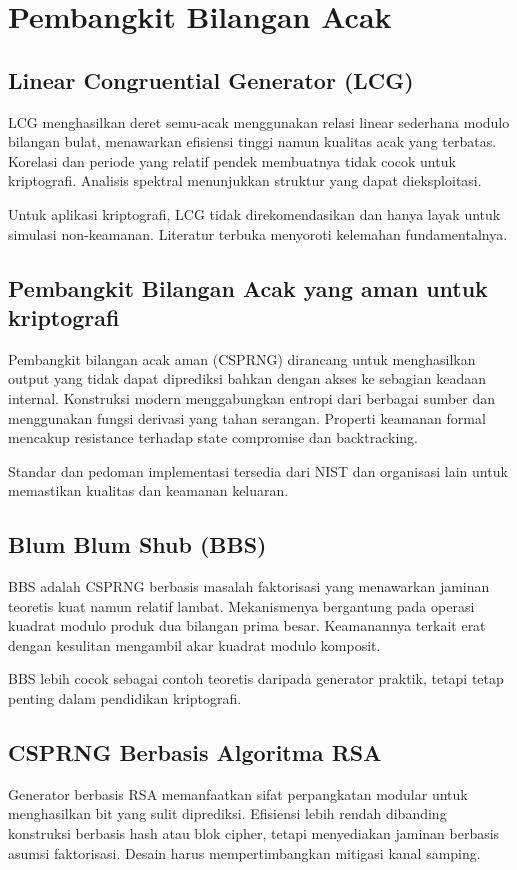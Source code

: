 \documentclass[../main.tex]{subfiles}
\begin{document}
\chapter{Pembangkit Bilangan Acak}

\section{Linear Congruential Generator (LCG)}
LCG menghasilkan deret semu-acak menggunakan relasi linear sederhana modulo bilangan bulat, menawarkan efisiensi tinggi namun kualitas acak yang terbatas. Korelasi dan periode yang relatif pendek membuatnya tidak cocok untuk kriptografi. Analisis spektral menunjukkan struktur yang dapat dieksploitasi.

Untuk aplikasi kriptografi, LCG tidak direkomendasikan dan hanya layak untuk simulasi non-keamanan. Literatur terbuka menyoroti kelemahan fundamentalnya.

\section{Pembangkit Bilangan Acak yang aman untuk kriptografi}
Pembangkit bilangan acak aman (CSPRNG) dirancang untuk menghasilkan output yang tidak dapat diprediksi bahkan dengan akses ke sebagian keadaan internal. Konstruksi modern menggabungkan entropi dari berbagai sumber dan menggunakan fungsi derivasi yang tahan serangan. Properti keamanan formal mencakup resistance terhadap state compromise dan backtracking.

Standar dan pedoman implementasi tersedia dari NIST dan organisasi lain untuk memastikan kualitas dan keamanan keluaran.

\section{Blum Blum Shub (BBS)}
BBS adalah CSPRNG berbasis masalah faktorisasi yang menawarkan jaminan teoretis kuat namun relatif lambat. Mekanismenya bergantung pada operasi kuadrat modulo produk dua bilangan prima besar. Keamanannya terkait erat dengan kesulitan mengambil akar kuadrat modulo komposit.

BBS lebih cocok sebagai contoh teoretis daripada generator praktik, tetapi tetap penting dalam pendidikan kriptografi.

\section{CSPRNG Berbasis Algoritma RSA}
Generator berbasis RSA memanfaatkan sifat perpangkatan modular untuk menghasilkan bit yang sulit diprediksi. Efisiensi lebih rendah dibanding konstruksi berbasis hash atau blok cipher, tetapi menyediakan jaminan berbasis asumsi faktorisasi. Desain harus mempertimbangkan mitigasi kanal samping.
\end{document}
